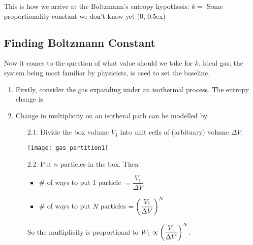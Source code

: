\documentclass[class=article, crop=false, 12pt]{standalone}
\begin{document}
This is how we arrive at the Boltzmann's entropy hypothesis:
{$k =$ Some proportionality constant we don't know yet}
{(0,-0.5ex)}


\subsection{Finding Boltzmann Constant}

Now it comes to the question of what value should we take for $k$. 
Ideal gas, the system being most familiar by physicists, 
is used to set the baseline. 

\begin{enumerate}
    \item Firstly, consider the gas expanding under an isothermal process.
    The entropy change is

    \item Change in multiplicity on an isotheral path can be modelled by
    \begin{enumerate}
        \item[2.1.] Divide the box volume $V_1$ into unit cells of (arbituary) volume $\Delta V$.
        \begin{center}
            \begin{minipage}{0.4\linewidth}
                \centering
                \texttt{[image: gas\_partition1]}
            \end{minipage}
        \end{center}

        \item[2.2.] Put $n$ particles in the box. Then
        \begin{itemize}
            \item \# of ways to put 1 particle $=\dfrac{V_1}{\Delta V}$
            \item \# of ways to put $N$ particles $=\qty(\dfrac{V_1}{\Delta V})^N$
        \end{itemize}
        So the multiplicity is proportional to $W_1 \propto \qty(\dfrac{V_1}{\Delta V})^N$.


\end{enumerate}
\end{enumerate}
\end{document}
